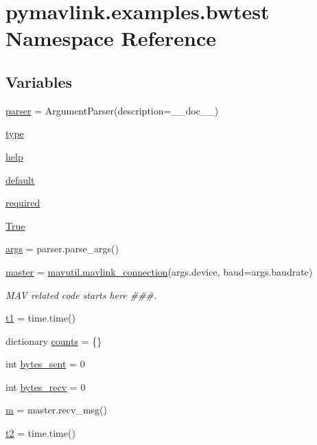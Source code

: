 \hypertarget{namespacepymavlink_1_1examples_1_1bwtest}{}\section{pymavlink.\+examples.\+bwtest Namespace Reference}
\label{namespacepymavlink_1_1examples_1_1bwtest}
\subsection*{Variables}
\begin{DoxyCompactItemize}
\item 
\mbox{\hyperlink{namespacepymavlink_1_1examples_1_1bwtest_afe076f1a3d008cd525c26a2a33b3d97f}{parser}} = Argument\+Parser(description=\+\_\+\+\_\+doc\+\_\+\+\_\+)
\item 
\mbox{\hyperlink{namespacepymavlink_1_1examples_1_1bwtest_afbde17ba1802e5962a67d9e3977f29c7}{type}}
\item 
\mbox{\hyperlink{namespacepymavlink_1_1examples_1_1bwtest_a8fd8509719d18e925ccec358a8dc0682}{help}}
\item 
\mbox{\hyperlink{namespacepymavlink_1_1examples_1_1bwtest_a77a2ab871e0aaf94ccf5bc881a5dbba4}{default}}
\item 
\mbox{\hyperlink{namespacepymavlink_1_1examples_1_1bwtest_a75801b54e117a46a4f239b09fc2c27b6}{required}}
\item 
\mbox{\hyperlink{namespacepymavlink_1_1examples_1_1bwtest_a66efa427cd2ab3c171e5342a383659ae}{True}}
\item 
\mbox{\hyperlink{namespacepymavlink_1_1examples_1_1bwtest_a033827b08f1d3dac4a810807b931550e}{args}} = parser.\+parse\+\_\+args()
\item 
\mbox{\hyperlink{namespacepymavlink_1_1examples_1_1bwtest_a992c5d2dd65ab9fdb16be40008f497a6}{master}} = \mbox{\hyperlink{namespacepymavlink_1_1mavutil_aa6c4b8861f86ef3bb746fa0fab241c93}{mavutil.\+mavlink\+\_\+connection}}(args.\+device, baud=args.\+baudrate)
\begin{DoxyCompactList}\small\item\em M\+AV related code starts here \#\#\#. \end{DoxyCompactList}\item 
\mbox{\hyperlink{namespacepymavlink_1_1examples_1_1bwtest_ad07e8a9178e3d4eddfb8db5f9525467f}{t1}} = time.\+time()
\item 
dictionary \mbox{\hyperlink{namespacepymavlink_1_1examples_1_1bwtest_a8337b9d2eb5466652348f85a132fdec6}{counts}} = \{\}
\item 
int \mbox{\hyperlink{namespacepymavlink_1_1examples_1_1bwtest_a005de8de5862bdd85d1299177ee51f58}{bytes\+\_\+sent}} = 0
\item 
int \mbox{\hyperlink{namespacepymavlink_1_1examples_1_1bwtest_ab55375291b155b2a2607fd48014a0d97}{bytes\+\_\+recv}} = 0
\item 
\mbox{\hyperlink{namespacepymavlink_1_1examples_1_1bwtest_a9e476130bb8cd37d293f893416517e55}{m}} = master.\+recv\+\_\+msg()
\item 
\mbox{\hyperlink{namespacepymavlink_1_1examples_1_1bwtest_aedbe1ae71ec87c7d11ca85658f4b81de}{t2}} = time.\+time()
\end{DoxyCompactItemize}


